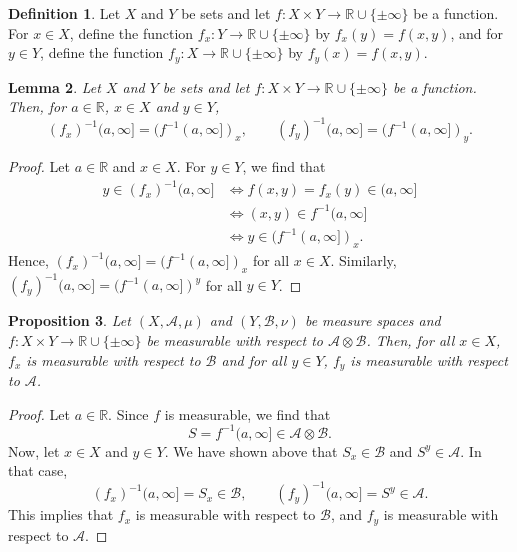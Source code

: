 \documentclass[a4paper, openany]{memoir}
\theoremstyle{definition}
\newtheorem{definition}{Definition}[section]
\theoremstyle{plain}
\newtheorem{lemma}[definition]{Lemma}
\newtheorem{proposition}[definition]{Proposition}
\begin{document}
    \begin{definition}
        Let $X$ and $Y$ be sets and let $f \colon X \times Y \to \mathbb{R} \cup \{\pm \infty\}$ be a function. For $x \in X$, define the function $f_x \colon Y \to \mathbb{R} \cup \{\pm \infty\}$ by $f_x(y) = f(x, y)$, and for $y \in Y$, define the function $f_y \colon X \to \mathbb{R} \cup \{\pm \infty\}$ by $f_y(x) = f(x, y)$.
    \end{definition}

    \begin{lemma}
        Let $X$ and $Y$ be sets and let $f \colon X \times Y \to \mathbb{R} \cup \{\pm \infty\}$ be a function. Then, for $a \in \mathbb{R}$, $x \in X$ and $y \in Y$,
        \[(f_x)^{-1}(a, \infty] = (f^{-1}(a, \infty])_x, \qquad (f_y)^{-1}(a, \infty] = (f^{-1}(a, \infty])_y.\]
    \end{lemma}
    \begin{proof}
        Let $a \in \mathbb{R}$ and $x \in X$. For $y \in Y$, we find that
        \begin{align*}
            y \in (f_x)^{-1}(a, \infty] &\iff f(x, y) = f_x(y) \in (a, \infty] \\
            &\iff (x, y) \in f^{-1}(a, \infty] \\
            &\iff y \in (f^{-1}(a, \infty])_x.
        \end{align*}
        Hence, $(f_x)^{-1}(a, \infty] = (f^{-1}(a, \infty])_x$ for all $x \in X$. Similarly, $(f_y)^{-1}(a, \infty] = (f^{-1}(a, \infty])^y$ for all $y \in Y$.
    \end{proof}

    \begin{proposition}
        Let $(X, \mathcal{A}, \mu)$ and $(Y, \mathcal{B}, \nu)$ be measure spaces and $f \colon X \times Y \to \mathbb{R} \cup \{\pm \infty\}$ be measurable with respect to $\mathcal{A} \otimes \mathcal{B}$. Then, for all $x \in X$, $f_x$ is measurable with respect to $\mathcal{B}$ and for all $y \in Y$, $f_y$ is measurable with respect to $\mathcal{A}$.
    \end{proposition}
    \begin{proof}
        Let $a \in \mathbb{R}$. Since $f$ is measurable, we find that
        \[S = f^{-1}(a, \infty] \in \mathcal{A} \otimes \mathcal{B}.\]
        Now, let $x \in X$ and $y \in Y$. We have shown above that $S_x \in \mathcal{B}$ and $S^y \in \mathcal{A}$. In that case,
        \[(f_x)^{-1}(a, \infty] = S_x \in \mathcal{B}, \qquad (f_y)^{-1}(a, \infty] = S^y \in \mathcal{A}.\]
        This implies that $f_x$ is measurable with respect to $\mathcal{B}$, and $f_y$ is measurable with respect to $\mathcal{A}$.
    \end{proof}
\end{document}
